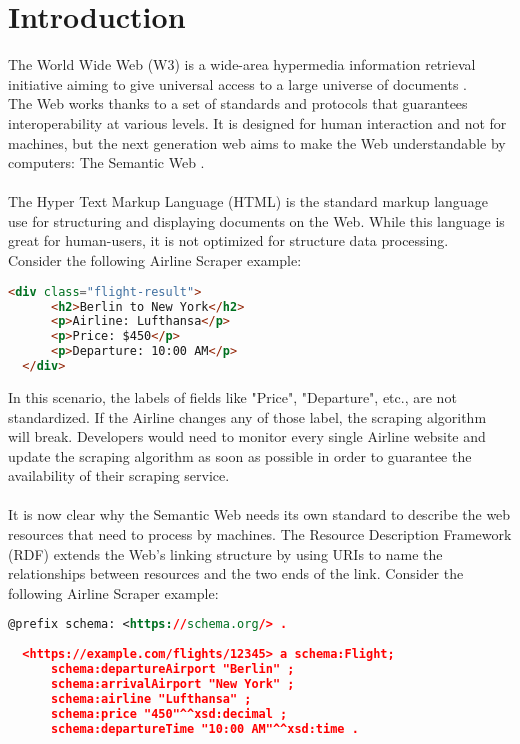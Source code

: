 \chapter{Introduction\label{cha:chapter1}}

The World Wide Web (W3) is a wide-area hypermedia information retrieval initiative aiming to give universal access to a large universe of documents \cite{www}.
\\
The Web works thanks to a set of standards and protocols that guarantees interoperability at various levels. 
It is designed for human interaction and not for machines, but the next generation web aims to make the Web understandable by computers: The Semantic Web \cite{sematicWeb}.
\\
\\
The Hyper Text Markup Language (HTML) is the standard markup language use for structuring and displaying documents on the Web. 
While this language is great for human-users, it is not optimized for structure data processing. 
\\
Consider the following Airline Scraper example:
\begin{lstlisting}[language=HTML, caption={Example of HTML flight data from a Airline company}, label={lst:html-example}]
  <div class="flight-result">
      <h2>Berlin to New York</h2>
      <p>Airline: Lufthansa</p>
      <p>Price: $450</p>
      <p>Departure: 10:00 AM</p>
  </div>
  \end{lstlisting}
In this scenario, the labels of fields like "Price", "Departure", etc., are not standardized. If the Airline changes any of those label, the scraping algorithm will break. 
Developers would need to monitor every single Airline website and update the scraping algorithm as soon as possible in order to guarantee the availability of their scraping service.
\\
\\
It is now clear why the Semantic Web needs its own standard to describe the web resources that need to process by machines.
The Resource Description Framework (RDF) extends the Web’s linking structure by using URIs to name the relationships between resources and the two ends of the link. 
Consider the following Airline Scraper example:
\begin{lstlisting}[language=XML, caption={RDF representation of the flight data}, label={lst:rdf-example}]
  @prefix schema: <https://schema.org/> .
  
  <https://example.com/flights/12345> a schema:Flight;
      schema:departureAirport "Berlin" ;
      schema:arrivalAirport "New York" ;
      schema:airline "Lufthansa" ;
      schema:price "450"^^xsd:decimal ;
      schema:departureTime "10:00 AM"^^xsd:time .
  \end{lstlisting}
